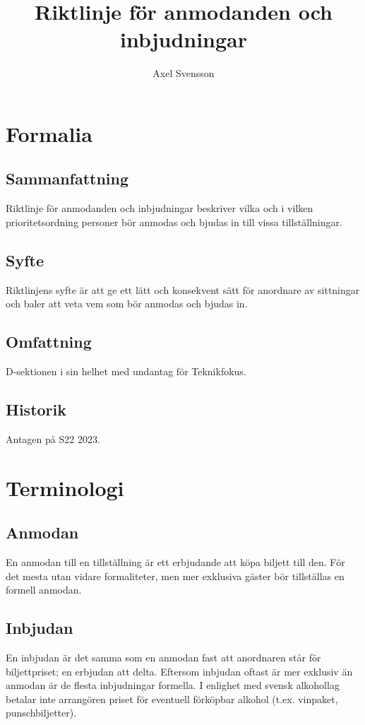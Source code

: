 \documentclass{dsekprotokoll}
\author{Axel Svensson}
\title{Riktlinje för anmodanden och inbjudningar}
\begin{document}
\maketitle
\section{Formalia}
\subsection{Sammanfattning}
Riktlinje för anmodanden och inbjudningar beskriver vilka och i vilken prioritetsordning personer bör anmodas och
bjudas in till vissa tillställningar.

\subsection{Syfte}
Riktlinjens syfte är att ge ett lätt och konsekvent sätt för anordnare av sittningar och baler att veta vem som bör anmodas och bjudas in.

\subsection{Omfattning}
D-sektionen i sin helhet med undantag för Teknikfokus.

\subsection{Historik}
Antagen på S22 2023.

\section{Terminologi}

\subsection{Anmodan}
En anmodan till en tillställning är ett erbjudande att köpa
biljett till den. För det mesta utan vidare formaliteter, men
mer exklusiva gäster bör tillställas en formell anmodan.

\subsection{Inbjudan}
En inbjudan är det samma som en anmodan fast att anordnaren står för biljettpriset; en erbjudan att delta. Eftersom
inbjudan oftast är mer exklusiv än anmodan är de flesta inbjudningar formella.
I enlighet med svensk alkohollag betalar inte arrangören priset för eventuell förköpbar alkohol (t.ex. vinpaket, punschbiljetter).
\end{document}
